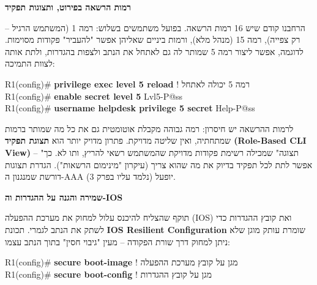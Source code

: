\documentclass[11pt]{article}
\newcommand{\enLR}[1]{\textenglish{#1}}
\newcommand{\subheading}[1]{\vskip6pt{\bfseries\color{h3}#1\par}\vskip2pt}
\begin{document}
\subheading{רמות הרשאה בפירוט, ותצוגות תפקיד}

הרחבנו קודם שיש \enLR{16} רמות הרשאה. בפועל משתמשים בשלוש: רמה \enLR{1} (המשתמש הרגיל – רק צפייה), רמה \enLR{15} (מנהל מלא), ורמות ביניים שאליהן אפשר "להעביר" פקודות מסוימות. לדוגמה, אפשר ליצור רמה \enLR{5} שמותר לה גם לאתחל את הנתב ולצפות בהגדרות, ולתת אותה לצוות התמיכה:\par

\begin{codebox}\begin{english}\codefont\footnotesize\color{cfg}\setlength{\parindent}{0pt}
R1(config)\# \textcolor{cbold}{\textbf{privilege exec level 5 reload}}            \textcolor{ccom}{\texthebrew{! רמה \enLR{5} יכולה לאתחל}}\\
R1(config)\# \textcolor{cbold}{\textbf{enable secret level 5}} Lvl5-P@ss\\
R1(config)\# \textcolor{cbold}{\textbf{username helpdesk privilege 5 secret}} Help-P@ss
\end{english}\end{codebox}

לרמות ההרשאה יש חיסרון: רמה גבוהה מקבלת אוטומטית גם את כל מה שמותר ברמות שמתחתיה, ואין שליטה מדויקת. פתרון מדויק יותר הוא \textbf{תצוגת תפקיד \enLR{(Role-Based CLI View)}} – "תצוגה" שמכילה רשימת פקודות מדויקת שהמשתמש רשאי להריץ, ותו לא. כך אפשר לתת לכל תפקיד בדיוק את מה שהוא צריך (עיקרון "מינימום הרשאות"). הגדרת תצוגות דורשת שמנגנון ה-\enLR{AAA} יופעל (נלמד עליו בפרק \enLR{3).}\par

\subheading{שמירה והגנה על ההגדרות וה-\enLR{IOS}}

תוקף שהצליח להיכנס עלול למחוק את מערכת ההפעלה \enLR{(IOS)} ואת קובץ ההגדרות כדי לשתק את הנתב לגמרי. תכונת \textbf{\enLR{IOS Resilient Configuration}} שומרת עותק מוגן שלא ניתן למחוק דרך שורת הפקודה – מעין "גיבוי חסין" בתוך הנתב עצמו:\par

\begin{codebox}\begin{english}\codefont\footnotesize\color{cfg}\setlength{\parindent}{0pt}
R1(config)\# \textcolor{cbold}{\textbf{secure boot-image}}    \textcolor{ccom}{\texthebrew{! מגן על קובץ מערכת ההפעלה}}\\
R1(config)\# \textcolor{cbold}{\textbf{secure boot-config}}   \textcolor{ccom}{\texthebrew{! מגן על קובץ ההגדרות}}
\end{english}\end{codebox}
\end{document}

